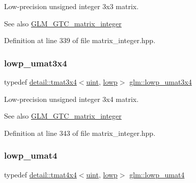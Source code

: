 Low-\/precision unsigned integer 3x3 matrix. \begin{DoxySeeAlso}{See also}
\hyperlink{group__gtc__matrix__integer}{G\+L\+M\+\_\+\+G\+T\+C\+\_\+matrix\+\_\+integer} 
\end{DoxySeeAlso}


Definition at line 339 of file matrix\+\_\+integer.\+hpp.

\mbox{\label{group__gtc__matrix__integer_gad44577fcaebad47da39cc244566d7fe3}} 
\subsubsection{\texorpdfstring{lowp\+\_\+umat3x4}{lowp\_umat3x4}}
{\footnotesize\ttfamily typedef \hyperlink{structglm_1_1detail_1_1tmat3x4}{detail\+::tmat3x4}$<$\hyperlink{group__core__precision_ga4fd29415871152bfb5abd588334147c8}{uint}, \hyperlink{namespaceglm_a0f04f086094c747d227af4425893f545ae161af3fc695e696ce3bf69f7332bc2d}{lowp}$>$ \hyperlink{group__gtc__matrix__integer_gad44577fcaebad47da39cc244566d7fe3}{glm\+::lowp\+\_\+umat3x4}}

Low-\/precision unsigned integer 3x4 matrix. \begin{DoxySeeAlso}{See also}
\hyperlink{group__gtc__matrix__integer}{G\+L\+M\+\_\+\+G\+T\+C\+\_\+matrix\+\_\+integer} 
\end{DoxySeeAlso}


Definition at line 343 of file matrix\+\_\+integer.\+hpp.

\mbox{\label{group__gtc__matrix__integer_ga571dcc0328ddd1d8c54eba047b5bfa2f}} 
\subsubsection{\texorpdfstring{lowp\+\_\+umat4}{lowp\_umat4}}
{\footnotesize\ttfamily typedef \hyperlink{structglm_1_1detail_1_1tmat4x4}{detail\+::tmat4x4}$<$\hyperlink{group__core__precision_ga4fd29415871152bfb5abd588334147c8}{uint}, \hyperlink{namespaceglm_a0f04f086094c747d227af4425893f545ae161af3fc695e696ce3bf69f7332bc2d}{lowp}$>$ \hyperlink{group__gtc__matrix__integer_ga571dcc0328ddd1d8c54eba047b5bfa2f}{glm\+::lowp\+\_\+umat4}}

